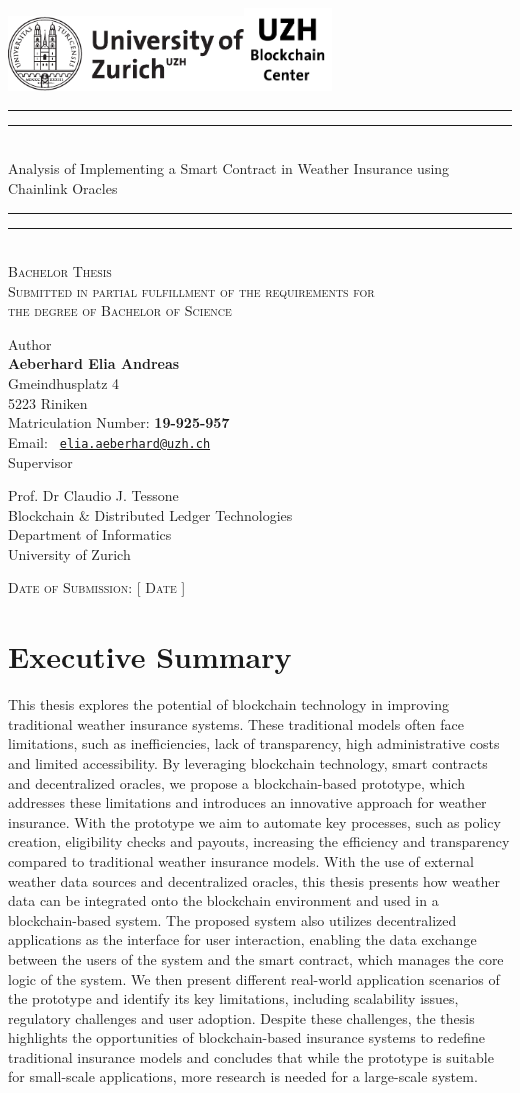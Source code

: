 \documentclass[11pt,a4paper,english,oneside]{book}
\makeatletter
\newcommand*{\uzhlogo}{\includegraphics[height=2cm]{Logo-UZH-black}}
\newcommand*{\bcclogo}{\includegraphics[height=2.2cm]{Logo-BCC-black}}
\newcommand*{\titleGP}{\begingroup %
\centering %
\vspace*{\baselineskip} %
\uzhlogo\hspace{8cm}\bcclogo\\[2\baselineskip] %

\rule{\textwidth}{1.6pt}\vspace*{-\baselineskip}\vspace*{2pt} %
\rule{\textwidth}{0.4pt}\\[\baselineskip] %
{\LARGE \sc Analysis of Implementing a Smart Contract in Weather Insurance using Chainlink Oracles}\\[0.2\baselineskip] %
\rule{\textwidth}{0.4pt}\vspace*{-\baselineskip}\vspace{3.2pt} %
\rule{\textwidth}{1.6pt}\\[2\baselineskip] %
\scshape %
Bachelor Thesis\\[2\baselineskip]
Submitted in partial fulfillment of the requirements for \\ the degree of Bachelor of Science \par
\vspace*{2\baselineskip}
Author\\
{\Large \textbf{Aeberhard Elia Andreas} \\ [8pt]
 }
Gmeindhusplatz 4 \\ 5223 Riniken \\[5pt]
Matriculation Number: \textbf{19-925-957}\\[8pt]
 Email: \texttt{ \href{mailto:elia.aeberhard@uzh.ch} {elia.aeberhard@uzh.ch} }  \\


\vspace*{2\baselineskip}
Supervisor\\
{\Large Prof. Dr Claudio J. Tessone\\[8pt]
\small Blockchain \& Distributed Ledger Technologies\\[5pt]Department of Informatics \\[8pt]University of Zurich\par}
\vspace*{2\baselineskip}

\vfill
{\scshape Date of Submission: [ Date ]} \\[0.3\baselineskip]
\endgroup}
\makeatother
\begin{document}
\thispagestyle{empty}
\titleGP
\newpage
\onehalfspacing
\setcounter{page}{1}

\section*{Executive Summary}
\thispagestyle{firststyle}
This thesis explores the potential of blockchain technology in improving traditional weather insurance systems. These traditional models often face limitations, such as inefficiencies, lack of transparency, high administrative costs and limited accessibility. By leveraging blockchain technology, smart contracts and decentralized oracles, we propose a blockchain-based prototype, which addresses these limitations and introduces an innovative approach for weather insurance. With the prototype we aim to automate key processes, such as policy creation, eligibility checks and payouts, increasing the efficiency and transparency compared to traditional weather insurance models. With the use of external weather data sources and decentralized oracles, this thesis presents how weather data can be integrated onto the blockchain environment and used in a blockchain-based system. The proposed system also utilizes decentralized applications as the interface for user interaction, enabling the data exchange between the users of the system and the smart contract, which manages the core logic of the system. We then present different real-world application scenarios of the prototype and identify its key limitations, including scalability issues, regulatory challenges and user adoption. Despite these challenges, the thesis highlights the opportunities of blockchain-based insurance systems to redefine traditional insurance models and concludes that while the prototype is suitable for small-scale applications, more research is needed for a large-scale system. 


\tableofcontents
\listoffigures
\listoftables
\newpage
{}








\newpage

\appendix
\noappendicestocpagenum
\addappheadtotoc

\renewcommand{\theequation}{A.\arabic{equation}}

%
%
\end{document}
